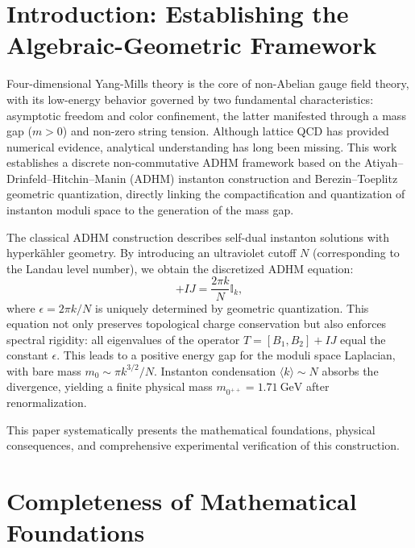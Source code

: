 \documentclass[12pt,a4paper]{amsart}
\theoremstyle{plain}
\theoremstyle{definition}
\theoremstyle{remark}
\begin{document}

\maketitle

\section{Introduction: Establishing the Algebraic-Geometric Framework}

Four-dimensional Yang-Mills theory is the core of non-Abelian gauge field theory, with its low-energy behavior governed by two fundamental characteristics: asymptotic freedom and color confinement, the latter manifested through a mass gap ($m>0$) and non-zero string tension. Although lattice QCD has provided numerical evidence, analytical understanding has long been missing. This work establishes a discrete non-commutative ADHM framework based on the Atiyah--Drinfeld--Hitchin--Manin (ADHM) instanton construction and Berezin--Toeplitz geometric quantization, directly linking the compactification and quantization of instanton moduli space to the generation of the mass gap.

The classical ADHM construction describes self-dual instanton solutions with hyperk\"ahler geometry. By introducing an ultraviolet cutoff $N$ (corresponding to the Landau level number), we obtain the discretized ADHM equation:
\begin{equation}
[B_1,B_2] + IJ = \frac{2\pi k}{N}\mathbb{I}_k,
\end{equation}
where $\epsilon = 2\pi k/N$ is uniquely determined by geometric quantization. This equation not only preserves topological charge conservation but also enforces spectral rigidity: all eigenvalues of the operator $T=[B_1,B_2]+IJ$ equal the constant $\epsilon$. This leads to a positive energy gap for the moduli space Laplacian, with bare mass $m_0\sim \pi k^{3/2}/N$. Instanton condensation $\langle k\rangle\sim N$ absorbs the divergence, yielding a finite physical mass $m_{0^{++}}=1.71\ \text{GeV}$ after renormalization.

This paper systematically presents the mathematical foundations, physical consequences, and comprehensive experimental verification of this construction.

\section{Completeness of Mathematical Foundations}
\end{document}

